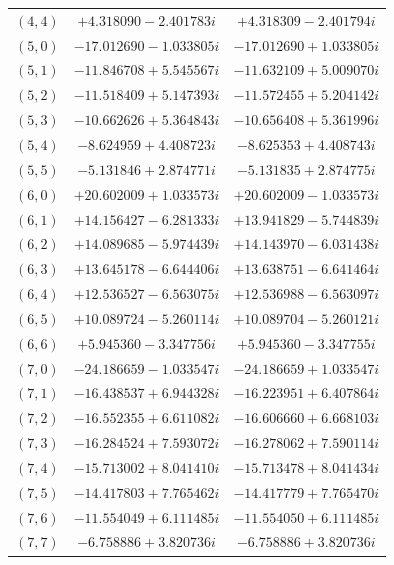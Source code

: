 \documentclass[10pt,dvipsnames,table]{article}
\begin{document}
\begin{table}[H]
\begin{tabular}{@{}ccc@{}}
$(4, 4)$ & $+4.318090 - 2.401783i$ & $+4.318309 - 2.401794i$ \\ \rowcolor{TableRowAlt}
$(5, 0)$ & $-17.012690 - 1.033805i$ & $-17.012690 + 1.033805i$ \\
$(5, 1)$ & $-11.846708 + 5.545567i$ & $-11.632109 + 5.009070i$ \\ \rowcolor{TableRowAlt}
$(5, 2)$ & $-11.518409 + 5.147393i$ & $-11.572455 + 5.204142i$ \\
$(5, 3)$ & $-10.662626 + 5.364843i$ & $-10.656408 + 5.361996i$ \\ \rowcolor{TableRowAlt}
$(5, 4)$ & $-8.624959 + 4.408723i$ & $-8.625353 + 4.408743i$ \\
$(5, 5)$ & $-5.131846 + 2.874771i$ & $-5.131835 + 2.874775i$ \\ \rowcolor{TableRowAlt}
$(6, 0)$ & $+20.602009 + 1.033573i$ & $+20.602009 - 1.033573i$ \\
$(6, 1)$ & $+14.156427 - 6.281333i$ & $+13.941829 - 5.744839i$ \\ \rowcolor{TableRowAlt}
$(6, 2)$ & $+14.089685 - 5.974439i$ & $+14.143970 - 6.031438i$ \\
$(6, 3)$ & $+13.645178 - 6.644406i$ & $+13.638751 - 6.641464i$ \\ \rowcolor{TableRowAlt}
$(6, 4)$ & $+12.536527 - 6.563075i$ & $+12.536988 - 6.563097i$ \\
$(6, 5)$ & $+10.089724 - 5.260114i$ & $+10.089704 - 5.260121i$ \\ \rowcolor{TableRowAlt}
$(6, 6)$ & $+5.945360 - 3.347756i$ & $+5.945360 - 3.347755i$ \\
$(7, 0)$ & $-24.186659 - 1.033547i$ & $-24.186659 + 1.033547i$ \\ \rowcolor{TableRowAlt}
$(7, 1)$ & $-16.438537 + 6.944328i$ & $-16.223951 + 6.407864i$ \\
$(7, 2)$ & $-16.552355 + 6.611082i$ & $-16.606660 + 6.668103i$ \\ \rowcolor{TableRowAlt}
$(7, 3)$ & $-16.284524 + 7.593072i$ & $-16.278062 + 7.590114i$ \\
$(7, 4)$ & $-15.713002 + 8.041410i$ & $-15.713478 + 8.041434i$ \\ \rowcolor{TableRowAlt}
$(7, 5)$ & $-14.417803 + 7.765462i$ & $-14.417779 + 7.765470i$ \\
$(7, 6)$ & $-11.554049 + 6.111485i$ & $-11.554050 + 6.111485i$ \\ \rowcolor{TableRowAlt}
$(7, 7)$ & $-6.758886 + 3.820736i$ & $-6.758886 + 3.820736i$ \\
\bottomrule
\end{tabular}
\end{table}
\end{document}
